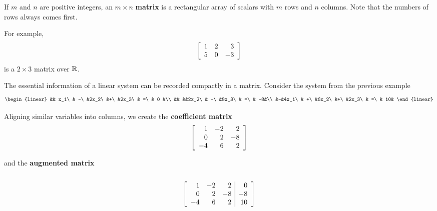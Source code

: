 \begin{Def} If $m$ and $n$ are positive integers, an $m\times n$ \textbf{matrix} is a rectangular array of scalars with $m$ rows and $n$ columns. Note that the numbers of rows always comes first.
\end{Def}

For example, \[\mtx{rrr}{1 & 2 & 3\\ 5 & 0 & -3}\] is a $2 \times 3$ matrix over $\R$.\\  %

\begin{multicols}{2}
The essential information of a linear system can be recorded compactly in a matrix. Consider the system from the previous example\\
\[\begin{linear}
&& x_1\ & -\ &2x_2\ &+\ &2x_3\ & =\ & 0 &\\ 
&& &&2x_2\ & -\ &8x_3\ & =\ & -8&\\ 
&-&4x_1\ & +\ &6x_2\ &+\ &2x_3\ & =\ & 10&
\end{linear}\]
\end{multicols}

\begin{multicols}{2}
\noindent Aligning similar variables into columns, we create the \textbf{coefficient matrix} \\
\[\mtx{rrr}{ 1 & -2 & 2\\ 0 & 2 & -8\\ -4 & 6 & 2}\] 
\end{multicols}
\begin{multicols}{2}
\noindent and the \label{def:augmentedmatrix}\textbf{augmented matrix}\\\\
\[\mtx{rrr|r}{ 1 & -2 & 2 & 0\\ 0 & 2 & -8 & -8\\ -4 & 6 & 2&10}\]
\end{multicols}


